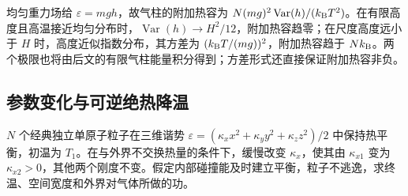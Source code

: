 均匀重力场给 $\varepsilon=mgh$，故气柱的附加热容为
$N(mg)^2\operatorname{Var}(h)/(k_{\mathrm B} T^2)$。在有限高度且高温接近均匀分布时，$\operatorname{Var}(h)\to H^2/12$，附加热容趋零；在尺度高度远小于 $H$ 时，高度近似指数分布，其方差为 $(k_{\mathrm B} T/(mg))^2$，附加热容趋于 $Nk_{\mathrm B}$。两个极限也将由后文的有限气柱能量积分得到；方差形式还直接保证附加热容非负。

\subsection{参数变化与可逆绝热降温}
\begin{example}[谐势阱缓慢减弱时的温度与功]
\label{ex:trapadiabat}
$N$ 个经典独立单原子粒子在三维谐势
$\varepsilon=(\kappa_xx^2+\kappa_yy^2+\kappa_zz^2)/2$
中保持热平衡，初温为 $T_1$。在与外界不交换热量的条件下，缓慢改变 $\kappa_x$，使其由 $\kappa_{x1}$ 变为 $\kappa_{x2}>0$，其他两个刚度不变。假定内部碰撞能及时建立平衡，粒子不逃逸，求终温、空间宽度和外界对气体所做的功。
\end{example}
